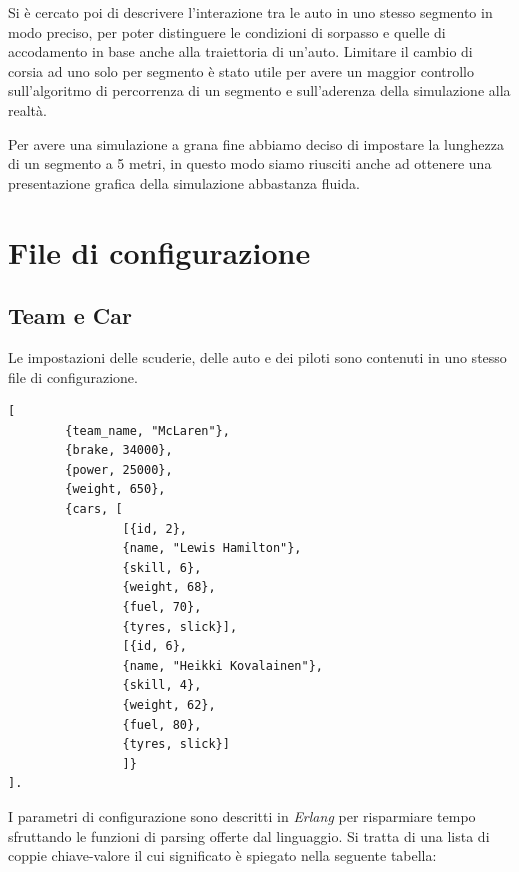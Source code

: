 \documentclass[11pt,a4paper]{report}
\begin{document}
Si è cercato poi di descrivere l'interazione tra le auto in uno stesso segmento in modo preciso, per poter distinguere le condizioni di sorpasso e quelle di accodamento in base anche alla traiettoria di un'auto. Limitare il cambio di corsia ad uno solo per segmento è stato utile per avere un maggior controllo sull'algoritmo di percorrenza di un segmento e sull'aderenza della simulazione alla realtà.

Per avere una simulazione a grana fine abbiamo deciso di impostare la lunghezza di un segmento a 5 metri, in questo modo siamo riusciti anche ad ottenere una presentazione grafica della simulazione abbastanza fluida.

\appendix

\chapter{File di configurazione}
\section*{Team e Car}
Le impostazioni delle scuderie, delle auto e dei piloti sono contenuti in uno stesso file di configurazione.
\begin{lstlisting}
[
        {team_name, "McLaren"},
        {brake, 34000},
        {power, 25000},
        {weight, 650},
        {cars, [
                [{id, 2},
                {name, "Lewis Hamilton"},
                {skill, 6},
                {weight, 68},
                {fuel, 70},
                {tyres, slick}],
                [{id, 6},
                {name, "Heikki Kovalainen"},
                {skill, 4},
                {weight, 62},
                {fuel, 80},
                {tyres, slick}]
                ]}
].
\end{lstlisting}

I parametri di configurazione sono descritti in \textit{Erlang} per risparmiare tempo sfruttando le funzioni di parsing offerte dal linguaggio. Si tratta di una lista di coppie chiave-valore il cui significato è spiegato nella seguente tabella:
\end{document}

